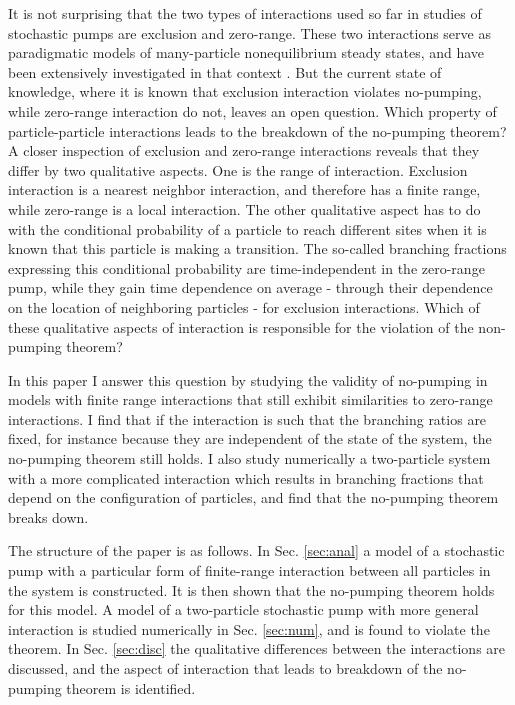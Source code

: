 \documentclass[aps,pre,showpacs,amsmath,amssymb,amsfonts,superscriptaddress,onecolumn,longbibliography]{revtex4-1}
\begin{document}
It is not surprising that the two types of interactions used so far in studies of stochastic pumps
are exclusion and zero-range. These two interactions serve as paradigmatic models of many-particle
nonequilibrium steady states, and have been extensively investigated in that context \cite{spohn_large_1991,kipnis_hydrodynamics_1989,evans_nonequilibrium_2005,levine_zero-range_2005,kipnis_scaling_1999}.
But the current state of knowledge, where it is known that exclusion interaction violates no-pumping, while zero-range
interaction do not, leaves an open question. Which property of particle-particle interactions leads
to the breakdown of the no-pumping theorem? A closer inspection of exclusion and zero-range interactions reveals that
they differ by two qualitative aspects.
One is the range of interaction. Exclusion interaction is a nearest neighbor interaction, and therefore has a finite range, while zero-range is a local
interaction. The other qualitative aspect has to do with the conditional probability of a particle to reach different sites
when it is known that this particle is making a transition. The so-called branching fractions expressing this
conditional probability are time-independent in the zero-range pump, while they gain time dependence on average -
through their dependence on the location of neighboring particles - for exclusion interactions. Which of these
qualitative aspects of interaction is responsible for the violation of the non-pumping theorem?

In this paper I answer this question by studying the validity of no-pumping in models with finite range
interactions that still exhibit similarities to zero-range interactions. I find that if the interaction is such
that the branching ratios are fixed, for instance because they are independent of the state of the system, the no-pumping theorem still holds.
I also study numerically a two-particle system
with a more complicated interaction which results in branching fractions that depend on the configuration of particles, and find that the no-pumping theorem breaks down.

The structure of the paper is as follows. In Sec. \ref{sec:anal} a model of a stochastic pump with a particular form
of finite-range interaction between all particles in the system is constructed. It is then shown that the no-pumping theorem
holds for this model. A model of a two-particle stochastic pump with more general interaction is studied numerically
in Sec. \ref{sec:num}, and is found to violate the theorem. In Sec. \ref{sec:disc} the qualitative differences between the interactions
are discussed, and the aspect of interaction that leads to breakdown of the no-pumping theorem is identified.
\end{document}
